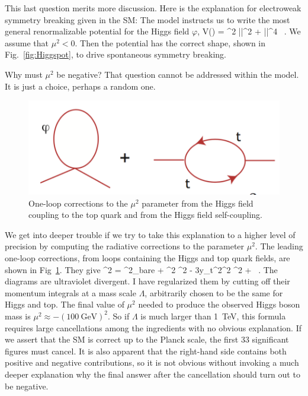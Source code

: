 \documentclass[12pt]{article}
\begin{document}
This last question merits more discussion.   Here is the explanation
for electroweak symmetry breaking given in the SM:   The
model instructs us to write the most general renormalizable potential 
for the Higgs field $\varphi$,
\beq
    V(\varphi) =  \mu^2 |\varphi|^2 + \lambda |\varphi|^4 \ . 
We assume that $\mu^2 < 0$.  Then the potential has the correct shape,
shown in Fig.~\ref{fig:Higgspot}, to
drive
spontaneous symmetry breaking.

Why must $\mu^2$ be negative?  That question cannot be addressed
within the model.   It is just a choice, perhaps a random one.

\begin{figure}
\begin{center}
\includegraphics[width=0.5\hsize]{honeloop.pdf}
\end{center}
\caption{One-loop corrections to the $\mu^2$ parameter from the Higgs
  field coupling to the top quark and from the Higgs field self-coupling.}
\label{fig:muoneloop}
\end{figure}



We get into deeper trouble if we try to take this explanation  to a higher
level of precision by computing the radiative corrections to the
parameter $\mu^2$.   The leading one-loop corrections, from loops
containing the Higgs and top quark fields, are shown in
Fig~\ref{fig:muoneloop}.  They give
\beq
 \mu^2 = \mu^2_{\rm bare} + {\lambda{}\pi^2} \Lambda^2 -
{ 3y_t^2\pi^2} \Lambda^2 + \cdots \ . 
The diagrams are ultraviolet divergent.   I have regularized them by
cutting off their momentum integrals at a mass scale $\Lambda $,
arbitrarily chosen to be the same for Higgs and top.    The final
value of $\mu^2$ needed to produce the observed Higgs boson mass is
$\mu^2 \approx - (100~\mbox{GeV})^2$.    So if $\Lambda$ is much
larger than 1~TeV, this formula requires large cancellations among the
ingredients with no obvious explanation.   If we assert that the
SM is correct up to the Planck scale,   the first 33
significant figures must cancel.   It is also apparent that the
right-hand side contains both positive and negative contributions, so
it is not obvious without invoking a much deeper explanation why the
final answer after the cancellation should turn out to be negative.
\end{document}
